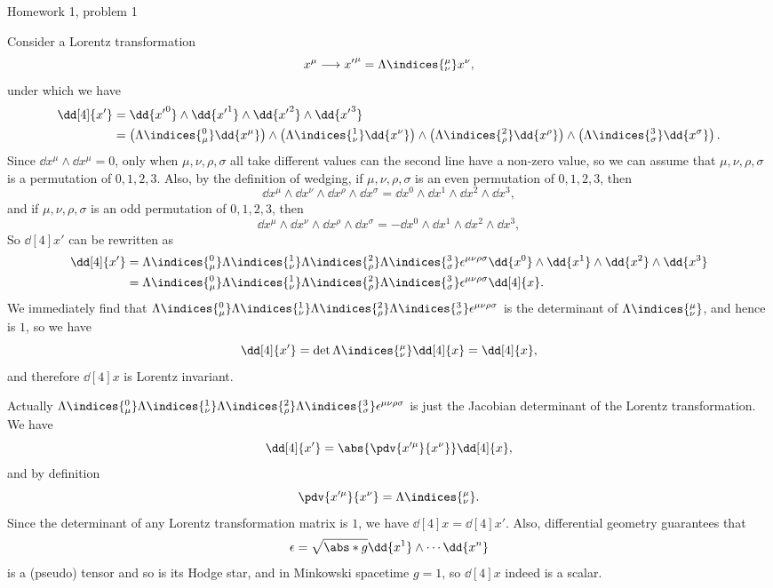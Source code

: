 
Homework 1, problem 1

Consider a Lorentz transformation
\[
    x^\mu \longrightarrow {x'}^{\mu} = \Lambda\indices{^{\mu}_\nu} x^\nu,
\] 
under which we have
\[
    \begin{aligned}
        \dd[4]{x'} &= \dd{{x'}^0} \wedge \dd{{x'}^1} \wedge \dd{{x'}^2} \wedge \dd{{x'}^3} \\
        &= \left( \Lambda\indices{^0_\mu} \dd{x^\mu} \right) \wedge \left( \Lambda\indices{^1_\nu} \dd{x^\nu} \right) \wedge \left( \Lambda\indices{^2_\rho} \dd{x^\rho} \right) \wedge \left( \Lambda\indices{^3_\sigma} \dd{x^\sigma} \right).
    \end{aligned}
\]
Since $\dd{x^\mu} \wedge \dd{x^\mu} = 0$, only when $\mu, \nu, \rho, \sigma$ all take different values can the second line have a non-zero value, so we can assume that $\mu, \nu, \rho, \sigma$ is a permutation of $0, 1, 2, 3$.
Also, by the definition of wedging, if $\mu, \nu, \rho, \sigma$ is an even permutation of $0, 1, 2, 3$, then
\[
    \dd{x^\mu} \wedge \dd{x^\nu} \wedge \dd{x^\rho} \wedge \dd{x^\sigma} = \dd{x^0} \wedge \dd{x^1} \wedge \dd{x^2} \wedge \dd{x^3},
\]
and if $\mu, \nu, \rho, \sigma$ is an odd permutation of $0, 1, 2, 3$, then
\[
    \dd{x^\mu} \wedge \dd{x^\nu} \wedge \dd{x^\rho} \wedge \dd{x^\sigma} = - \dd{x^0} \wedge \dd{x^1} \wedge \dd{x^2} \wedge \dd{x^3},
\]
So $\dd[4]{x'}$ can be rewritten as 
\[
    \begin{aligned}
        \dd[4]{x'} &= \Lambda\indices{^0_\mu} \Lambda\indices{^1_\nu} \Lambda\indices{^2_\rho} \Lambda\indices{^3_\sigma} \epsilon^{\mu \nu \rho \sigma} \dd{x^0} \wedge \dd{x^1} \wedge \dd{x^2} \wedge \dd{x^3} \\
        &= \Lambda\indices{^0_\mu} \Lambda\indices{^1_\nu} \Lambda\indices{^2_\rho} \Lambda\indices{^3_\sigma} \epsilon^{\mu \nu \rho \sigma} \dd[4]{x}.
    \end{aligned}
\]
We immediately find that $\Lambda\indices{^0_\mu} \Lambda\indices{^1_\nu} \Lambda\indices{^2_\rho} \Lambda\indices{^3_\sigma} \epsilon^{\mu \nu \rho \sigma}$ is the determinant of $\Lambda\indices{^\mu_\nu}$, and hence is $1$, so we have
\[
    \dd[4]{x'} = \det \Lambda\indices{^\mu_\nu} \dd[4]{x} = \dd[4]{x},
\]
and therefore $\dd[4]{x}$ is Lorentz invariant.

Actually $\Lambda\indices{^0_\mu} \Lambda\indices{^1_\nu} \Lambda\indices{^2_\rho} \Lambda\indices{^3_\sigma} \epsilon^{\mu \nu \rho \sigma}$ is just the Jacobian determinant of the Lorentz transformation.
We have
\[
    \dd[4]{x'} = \abs{\pdv{x'^\mu}{x^\nu}} \dd[4]{x},
\]
and by definition 
\[
    \pdv{x'^\mu}{x^\nu} = \Lambda\indices{^\mu_\nu}.    
\]
Since the determinant of any Lorentz transformation matrix is $1$, we have $\dd[4]{x} = \dd[4]{x'}$.
Also, differential geometry guarantees that 
\[
    \epsilon = \sqrt{\abs*{g}} \dd{x^1} \wedge \cdots \dd{x^n}
\]
is a (pseudo) tensor and so is its Hodge star, and in Minkowski spacetime $g = 1$, so $\dd[4]{x}$ indeed is a scalar. 
